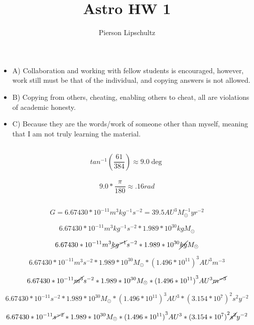 \documentclass{article}
\title{Astro HW 1}
\author{Pierson Lipschultz}
\begin{document}
\maketitle
\section{}
\subsection{}
\begin{itemize}
    \item A) Collaboration and working with fellow students is encouraged, however, work still must be that of the individual, and copying answers is not allowed. 
    \item B) Copying from others, cheating, enabling others to cheat, all are violations of academic honesty.
    \item C) Because they are the words/work of someone other than myself, meaning that I am not truly learning the material. 
\end{itemize}
\subsection{}

\[tan^{-1}(\frac{61}{384}) \approx 9.0\deg\] \\
\[9.0 * \frac{\pi}{180} \approx .16rad\]

\subsection{}

\[G = 6.67430 * 10^{-11} m^{3} kg^{-1} s^{-2} = 39.5 AU^{3} M_{\odot}^{-1} yr^{-2}\]

\[6.67430 * 10^{-11} m^{3} kg^{-1} s^{-2} * 1.989 * 10^{30}kg M_{\odot}\]

\[6.67430 * 10^{-11} m^{3} \cancel{kg^{-1}} s^{-2} * 1.989 * 10^{30}\cancel{kg} M_{\odot}\]

\[6.67430 * 10^{-11} m^{3} s^{-2} * 1.989 * 10^{30} M_{\odot} * {(1.496 * 10^{11})}^3 AU^3 m^{-3}\]

\[6.67430 * 10^{-11} \cancel{m^{3}} s^{-2} * 1.989 * 10^{30} M_{\odot} * {(1.496 * 10^{11})}^3 AU^3 \cancel{m^{-3}}\]

\[6.67430 * 10^{-11} s^{-2} * 1.989 * 10^{30} M_{\odot} * {(1.496 * 10^{11})}^3 AU^3 * {(3.154 * 10^7)}^2 s^{2} y^{-2}\] 

\[6.67430 * 10^{-11} \cancel{s^{-2}} * 1.989 * 10^{30} M_{\odot} * {(1.496 * 10^{11})}^3 AU^3 * {(3.154 * 10^7)}^2 \cancel{s^{2}} y^{-2}\] 
\end{document}
